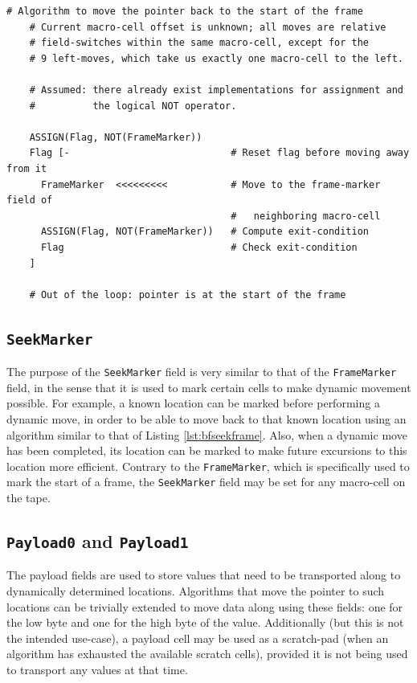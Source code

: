 \begin{lstfloat}[H]
  \begin{lstlisting}[style=brainfuck]
    # Algorithm to move the pointer back to the start of the frame
    # Current macro-cell offset is unknown; all moves are relative
    # field-switches within the same macro-cell, except for the
    # 9 left-moves, which take us exactly one macro-cell to the left.

    # Assumed: there already exist implementations for assignment and
    #          the logical NOT operator.
    
    ASSIGN(Flag, NOT(FrameMarker))
    Flag [-                            # Reset flag before moving away from it
      FrameMarker  <<<<<<<<<           # Move to the frame-marker field of
                                       #   neighboring macro-cell
      ASSIGN(Flag, NOT(FrameMarker))   # Compute exit-condition
      Flag                             # Check exit-condition
    ]

    # Out of the loop: pointer is at the start of the frame
  \end{lstlisting}
  \caption{Algorithm to seek left to the start of the current frame from an unknown initial position.}
  \label{lst:bfseekframe}
\end{lstfloat}

\subsection{\texttt{SeekMarker}}
The purpose of the \texttt{SeekMarker} field is very similar to that of the \texttt{FrameMarker} field, in the sense that it is used to mark certain cells to make dynamic movement possible. For example, a known location can be marked before performing a dynamic move, in order to be able to move back to that known location using an algorithm similar to that of Listing \ref{lst:bfseekframe}. Also, when a dynamic move has been completed, its location can be marked to make future excursions to this location more efficient. Contrary to the \texttt{FrameMarker}, which is specifically used to mark the start of a frame, the \texttt{SeekMarker} field may be set for any macro-cell on the tape.

\subsection{\texttt{Payload0} and \texttt{Payload1}}
The payload fields are used to store values that need to be transported along to dynamically determined locations. Algorithms that move the pointer to such locations can be trivially extended to move data along using these fields: one for the low byte and one for the high byte of the value. Additionally (but this is not the intended use-case), a payload cell may be used as a scratch-pad (when an algorithm has exhausted the available scratch cells), provided it is not being used to transport any values at that time.

